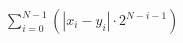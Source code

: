 \documentclass{article}
\begin{document}
$\sum_{i=0}^{N-1}(|x_i - y_i| \cdot 2^{N-i-1})$
\pagebreak
\end{document}
